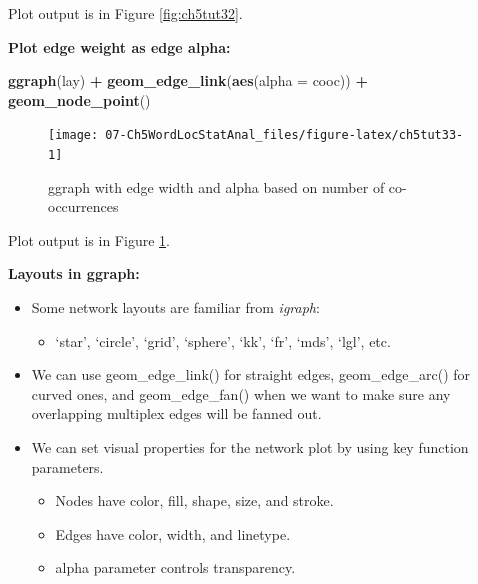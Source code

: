 \documentclass[
]{article}
\newenvironment{Shaded}{\begin{snugshade}}{\end{snugshade}}
\newcommand{\AttributeTok}[1]{\textcolor[rgb]{0.13,0.29,0.53}{#1}}
\newcommand{\FunctionTok}[1]{\textcolor[rgb]{0.13,0.29,0.53}{\textbf{#1}}}
\newcommand{\NormalTok}[1]{#1}
\newcommand{\SpecialCharTok}[1]{\textcolor[rgb]{0.81,0.36,0.00}{\textbf{#1}}}
\providecommand{\tightlist}{%
  \setlength{\itemsep}{0pt}\setlength{\parskip}{0pt}}
\begin{document}
Plot output is in Figure \ref{fig:ch5tut32}.

\textbf{Plot edge weight as edge alpha:}

\begin{Shaded}
\begin{Highlighting}[]
\FunctionTok{ggraph}\NormalTok{(lay) }\SpecialCharTok{+} 
  \FunctionTok{geom\_edge\_link}\NormalTok{(}\FunctionTok{aes}\NormalTok{(}\AttributeTok{alpha =}\NormalTok{ cooc)) }\SpecialCharTok{+} 
  \FunctionTok{geom\_node\_point}\NormalTok{()}
\end{Highlighting}
\end{Shaded}

\begin{figure}

{\centering \texttt{[image: 07-Ch5WordLocStatAnal\_files/figure-latex/ch5tut33-1]} 

}

\caption{ggraph with edge width and alpha based on number of co-occurrences}\label{fig:ch5tut33}
\end{figure}

Plot output is in Figure \ref{fig:ch5tut33}.

\textbf{Layouts in ggraph:}

\begin{itemize}
\tightlist
\item
  Some network layouts are familiar from \emph{igraph}:

  \begin{itemize}
  \tightlist
  \item
    `star', `circle', `grid', `sphere', `kk', `fr', `mds', `lgl', etc.
  \end{itemize}
\item
  We can use geom\_edge\_link() for straight edges, geom\_edge\_arc() for curved ones, and geom\_edge\_fan() when we want to make sure any overlapping multiplex edges will be fanned out.
\item
  We can set visual properties for the network plot by using key function parameters.

  \begin{itemize}
  \tightlist
  \item
    Nodes have color, fill, shape, size, and stroke.
  \item
    Edges have color, width, and linetype.
  \item
    alpha parameter controls transparency.
  \end{itemize}
\end{itemize}
\end{document}
